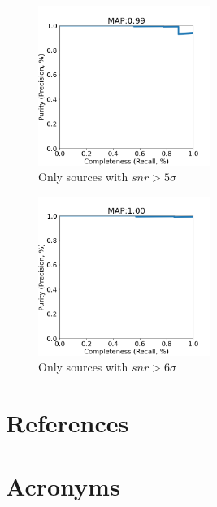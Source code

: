 \documentclass[DM,authoryear,toc]{lsstdoc}
\begin{document}
\begin{figure}[h]
  \centering
  \includegraphics[width=0.5\textwidth]{precrec___checkpoint_epoch0000087_iter0200000____rbdata_data_npy_data_gt1M-5sigma___posw_30.png}
  \caption{Only sources with $snr > 5\sigma$}
  \label{fig:tract_templates}
\end{figure}

\begin{figure}[h]
  \centering
  \includegraphics[width=0.5\textwidth]{precrec___checkpoint_epoch0000087_iter0200000____rbdata_data_npy_data_gt1M-6sigma___posw_30.png}
  \caption{Only sources with $snr > 6\sigma$}
  \label{fig:tract_templates}
\end{figure}


\appendix
\section{References} \label{sec:bib}
\renewcommand{\refname}{} %


\section{Acronyms} \label{sec:acronyms}

\end{document}

